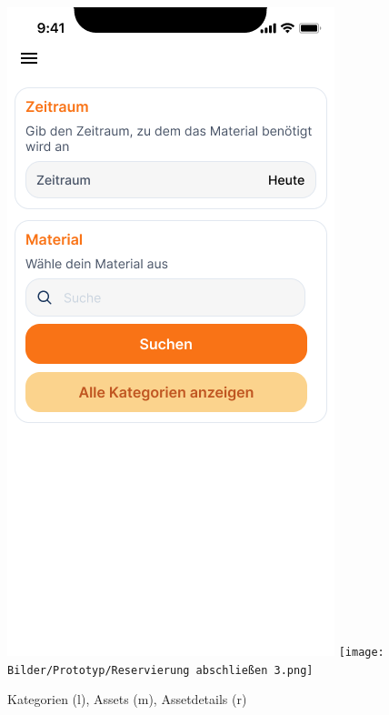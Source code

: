 \begin{figure}[h]
    \includegraphics[scale=0.3]{Bilder/Prototyp/Neu/Suche.png}\hspace{2em}
    \texttt{[image: Bilder/Prototyp/Reservierung abschließen 3.png]}
    \label{fig:p3}
    \caption[Mockup: Kategorien, Assets, Assetdetails]{Kategorien (l), Assets (m), Assetdetails (r)}
\end{figure}